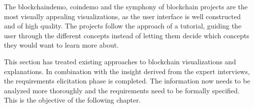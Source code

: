 The blockchaindemo, coindemo and the symphony of blockchain projects are the most visually appealing visualizations, as the user interface is well constructed and of high quality. The projects follow the approach of a tutorial, guiding the user through the different concepts instead of letting them decide which concepts they would want to learn more about.

This section has treated existing approaches to blockchain visualizations and explanations. In combination with the insight derived from the expert interviews, the requirements elicitation phase is completed. The information now needs to be analyzed more thoroughly and the requirements need to be formally specified. This is the objective of the following chapter.